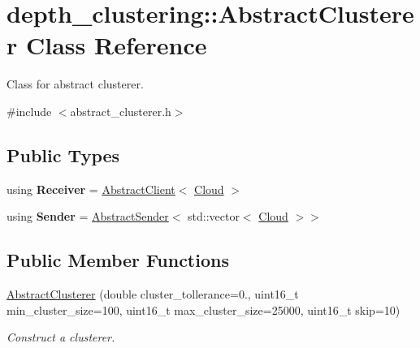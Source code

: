 \hypertarget{classdepth__clustering_1_1AbstractClusterer}{\section{depth\-\_\-clustering\-:\-:Abstract\-Clusterer Class Reference}
\label{classdepth__clustering_1_1AbstractClusterer}
}


Class for abstract clusterer.  




{\ttfamily \#include $<$abstract\-\_\-clusterer.\-h$>$}

\subsection*{Public Types}
\begin{DoxyCompactItemize}
\item 
\hypertarget{classdepth__clustering_1_1AbstractClusterer_a6417b572cb4d8e851fa5bb88eacfdeb4}{using {\bfseries Receiver} = \hyperlink{classdepth__clustering_1_1AbstractClient}{Abstract\-Client}$<$ \hyperlink{classdepth__clustering_1_1Cloud}{Cloud} $>$}\label{classdepth__clustering_1_1AbstractClusterer_a6417b572cb4d8e851fa5bb88eacfdeb4}

\item 
\hypertarget{classdepth__clustering_1_1AbstractClusterer_afbba93333487772e81cc718e183c1fe6}{using {\bfseries Sender} = \hyperlink{classdepth__clustering_1_1AbstractSender}{Abstract\-Sender}$<$ std\-::vector$<$ \hyperlink{classdepth__clustering_1_1Cloud}{Cloud} $>$$>$}\label{classdepth__clustering_1_1AbstractClusterer_afbba93333487772e81cc718e183c1fe6}

\end{DoxyCompactItemize}
\subsection*{Public Member Functions}
\begin{DoxyCompactItemize}
\item 
\hyperlink{classdepth__clustering_1_1AbstractClusterer_a6be8ef3c30066a96e1efa0f082634ed0}{Abstract\-Clusterer} (double cluster\-\_\-tollerance=0., uint16\-\_\-t min\-\_\-cluster\-\_\-size=100, uint16\-\_\-t max\-\_\-cluster\-\_\-size=25000, uint16\-\_\-t skip=10)
\begin{DoxyCompactList}\small\item\em Construct a clusterer. \end{DoxyCompactList}\end{DoxyCompactItemize}

